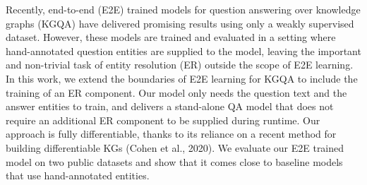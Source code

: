 Recently, end-to-end (E2E) trained models for question answering over knowledge graphs (KGQA) have delivered promising results using only a weakly supervised dataset. However, these models are trained and evaluated in a setting where hand-annotated question entities are supplied to the model, leaving the important and non-trivial task of entity resolution (ER) outside the scope of E2E learning. In this work, we extend the boundaries of E2E learning for KGQA to include the training of an ER component. Our model only needs the question text and the answer entities to train, and delivers a stand-alone QA model that does not require an additional ER component to be supplied during runtime. Our approach is fully differentiable, thanks to its reliance on a recent method for building differentiable KGs (Cohen et al., 2020). We evaluate our E2E trained model on two public datasets and show that it comes close to baseline models that use hand-annotated entities.
